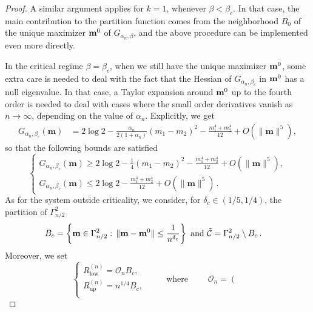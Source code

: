 \documentclass[10pt,a4paper]{amsart}
\def \bm {{\bf m}}
\begin{document}
\begin{proof}
A similar argument applies for $k=1$, whenever $\beta<\beta_c$.
In that case, the main contribution to the partition function comes 
from the neighborhood $B_0$ of the unique maximizer $\bm^0$ of $G_{\alpha_n,\beta}$, and the above procedure can be implemented even more directly. %

In the critical regime $\beta=\beta_c$, when we still have the unique maximizer $\bm^0$, some extra care is needed to deal with the fact that
the Hessian of $G_{\alpha_n,\beta_c}$ in $\bm^0$  has a null eigenvalue.
In that case, a Taylor expansion around $\bm^0$ up to the fourth order is needed to deal with cases where the small order derivatives vanish as $n\to\infty$, depending on the value of $\alpha_n$. 
Explicitly, we get
\begin{align}\label{eq:Exp-G-Crit}
   G_{\alpha_n,\beta_c}(\mathbf{m})
&= 2\log 2
-\frac{\alpha_n}{2(1+\alpha_n)}(m_1-m_2)^2
- \frac{m_1^4+m_2^4}{12}
+ O(\|\mathbf{m}\|^5),
\end{align}
%
so that the following bounds are satisfied
\begin{equation}\label{bound-G-crit}
\left\{
\begin{array}{l}
G_{\alpha_n,\beta_c}(\mathbf{m}) 
\ge 2\log 2 -\frac{1}{4}(m_1-m_2)^2 - \frac{m_1^4+m_2^4}{12}
+ O(\|\mathbf{m}\|^5),\\[0.3cm]
G_{\alpha_n,\beta_c}(\mathbf{m}) 
\le 2\log 2 - \frac{m_1^4+m_2^4}{12}
+ O(\|\mathbf{m}\|^5)\,.
\end{array}
\right.
\end{equation}
As for the system outside criticality, we consider, for  $\delta_c \in (1/5, 1/4)$,
the partition of $\Gamma_{n/2}^2$
\begin{equation}\label{def:DNtilde}
\begin{split}
& B_c= \left \{ \bm \in \Gamma_{n/2}^2: \, \|\bm-\bm^0\| \leq \frac{1}{n^{\delta_c}} \right \} \,\, \text{and}
    \,\, \mathcal{\tilde{C}}=\Gamma_{n/2}^2 \setminus B_c \,. 
    \end{split}
\end{equation}
Moreover, we set
\begin{equation}
 \left\{\begin{array}{l}
 R_{\text{low}}^{(n)} =
\mathcal{O}_n B_c,
 \\[0.5cm]
 R_{\text{up}}^{(n)} =
n^{1/4} B_c,
\\
\end{array}
\right.
\qquad
\mbox{ where }
\qquad
\mathcal{O}_n=
\left(
\begin{array}{ll}

\end{array}
\end{equation}
\end{proof}
\end{document}

